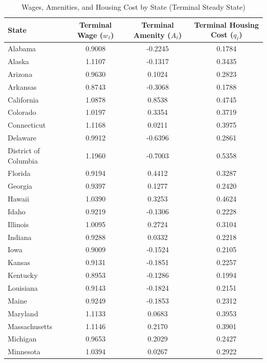 \begin{table}[H]
    \centering
    \footnotesize
    \renewcommand{\arraystretch}{0.85}
    \caption{Wages, Amenities, and Housing Cost by State (Terminal Steady State)}
    \label{tab:state_wages_amenities_housing_terminal}
    \begin{tabular}{lccc}
        \toprule
        \textbf{State} & \textbf{Terminal Wage} ($w_\ell$) & \textbf{Terminal Amenity} ($A_\ell$) & \textbf{Terminal Housing Cost} ($q_\ell$) \\
        \midrule
        Alabama & 0.9008 & -0.2245 & 0.1784 \\
        Alaska & 1.1107 & -0.1317 & 0.3435 \\
        Arizona & 0.9630 & 0.1024 & 0.2823 \\
        Arkansas & 0.8743 & -0.3068 & 0.1788 \\
        California & 1.0878 & 0.8538 & 0.4745 \\
        Colorado & 1.0197 & 0.3354 & 0.3719 \\
        Connecticut & 1.1168 & 0.0211 & 0.3975 \\
        Delaware & 0.9912 & -0.6396 & 0.2861 \\
        District of Columbia & 1.1960 & -0.7003 & 0.5358 \\
        Florida & 0.9194 & 0.4412 & 0.3287 \\
        Georgia & 0.9397 & 0.1277 & 0.2420 \\
        Hawaii & 1.0390 & 0.3253 & 0.4624 \\
        Idaho & 0.9219 & -0.1306 & 0.2228 \\
        Illinois & 1.0095 & 0.2724 & 0.3104 \\
        Indiana & 0.9288 & 0.0332 & 0.2218 \\
        Iowa & 0.9009 & -0.1524 & 0.2105 \\
        Kansas & 0.9131 & -0.1851 & 0.2257 \\
        Kentucky & 0.8953 & -0.1286 & 0.1994 \\
        Louisiana & 0.9143 & -0.1824 & 0.2151 \\
        Maine & 0.9249 & -0.1853 & 0.2312 \\
        Maryland & 1.1133 & 0.0683 & 0.3953 \\
        Massachusetts & 1.1146 & 0.2170 & 0.3901 \\
        Michigan & 0.9653 & 0.2029 & 0.2427 \\
        Minnesota & 1.0394 & 0.0267 & 0.2922 \\

\end{tabular}
\end{table}
